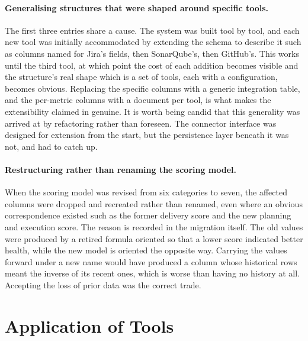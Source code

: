 \paragraph{Generalising structures that were shaped around specific tools.}
The first three entries share a cause. The system was built tool by tool, and
each new tool was initially accommodated by extending the schema to describe it such as
columns named for Jira's fields, then SonarQube's, then GitHub's. This works
until the third tool, at which point the cost of each addition becomes visible
and the structure's real shape which is a set of tools, each with a configuration,
becomes obvious. Replacing the specific columns with a generic integration table,
and the per-metric columns with a document per tool, is what makes the
extensibility claimed in  genuine. It is
worth being candid that this generality was arrived at by refactoring rather than
foreseen. The connector interface was designed for extension from the start, but
the persistence layer beneath it was not, and had to catch up.

\paragraph{Restructuring rather than renaming the scoring model.}
When the scoring model was revised from six categories to seven, the affected
columns were dropped and recreated rather than renamed, even where an obvious
correspondence existed such as the former delivery score and the new planning and
execution score. The reason is recorded in the migration itself. 
The old values were produced by a retired formula oriented so that a lower score
indicated better health, while the new model is oriented the opposite way.
Carrying the values forward under a new name would have produced a column whose
historical rows meant the inverse of its recent ones, which is worse than having
no history at all. Accepting the loss of prior data was the correct trade.




\section{Application of Tools}
\label{sec:tools}

